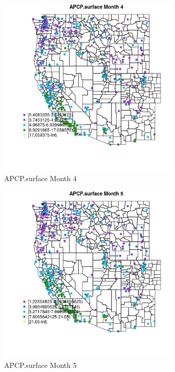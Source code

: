 \begin{figure} 
\centering  
\includegraphics[width=0.77\textwidth]{Code_Outputs/ML_input_report_ML_input_PM25_Step5_part_d_de_duplicated_aves_ML_input_MapObsMo4APCPsurface.jpg} 
\caption{\label{fig:ML_input_report_ML_input_PM25_Step5_part_d_de_duplicated_aves_ML_inputMapObsMo4APCPsurface}APCP.surface Month 4} 
\end{figure} 
 

\begin{figure} 
\centering  
\includegraphics[width=0.77\textwidth]{Code_Outputs/ML_input_report_ML_input_PM25_Step5_part_d_de_duplicated_aves_ML_input_MapObsMo5APCPsurface.jpg} 
\caption{\label{fig:ML_input_report_ML_input_PM25_Step5_part_d_de_duplicated_aves_ML_inputMapObsMo5APCPsurface}APCP.surface Month 5} 
\end{figure} 
 

